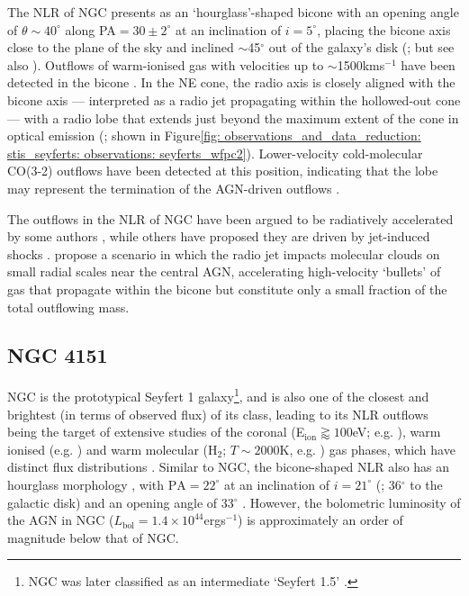 The NLR of NGC presents as an `hourglass'-shaped bicone \citep{Riffel2014, Barbosa2014, May2017} with an opening angle of $\theta \sim 40^\circ$ along PA$=30\pm2^\circ$ at an inclination of $i=5^\circ$, placing the bicone axis close to the plane of the sky and inclined $\sim$45$^\circ$ out of the galaxy's disk (\citealt{Das2006}; but see also \citealt{Crenshaw2000a}). Outflows of warm-ionised gas with velocities up to $\sim$1500\;km\;s$^{-1}$ have been detected in the bicone \citep{Crenshaw2000_N1068, Das2006}. In the NE cone, the radio axis is closely aligned with the bicone axis --- interpreted as a radio jet propagating within the hollowed-out cone --- with a radio lobe that extends just beyond the maximum extent of the cone in optical emission (\citealt{WilsonUlvestad1987}; shown in Figure\;\ref{fig: observations_and_data_reduction: stis_seyferts: observations: seyferts_wfpc2}). Lower-velocity cold-molecular CO(3-2) outflows have been detected at this position, indicating that the lobe may represent the termination of the AGN-driven outflows \citep{GarciaBurillo2014}.

The outflows in the NLR of NGC have been argued to be radiatively accelerated by some authors \citep{Kraemer2000III, Das2006, Revalski2021, Meena2023, Fischer2023}, while others have proposed they are driven by jet-induced shocks \citep{Capetti1997, Axon1998}. \citet{May2017} propose a scenario in which the radio jet impacts molecular clouds on small radial scales near the central AGN, accelerating high-velocity `bullets' of gas that propagate within the bicone but constitute only a small fraction of the total outflowing mass.

\vfill

\newpage

\subsection{NGC 4151}
\label{section: stis_seyferts: ngc4151}

NGC is the prototypical Seyfert 1 galaxy\footnote{NGC was later classified as an intermediate `Seyfert 1.5' \citep{OsterbrockKoski1976, Robinson1994}.}, and is also one of the closest and brightest (in terms of observed flux) of its class, leading to its NLR outflows being the target of extensive studies of the coronal (E$_\mathrm{ion}\gtrapprox100$\;eV; e.g. \citealt{Storchi-Bergmann2009, Storchi-Bergmann2010}), warm ionised (e.g. \citealt{Winge1997, Hutchings1999, Crenshaw2000_N4151, Das2005, May2020}) and warm molecular (H$_\mathrm{2}$; $T\sim2000$\;K, e.g. \citealt{May2020}) gas phases, which have distinct flux distributions \citep{Storchi-Bergmann2009}. Similar to NGC, the bicone-shaped NLR also has an hourglass morphology \citep{May2020}, with $\mathrm{PA}=22^\circ$ at an inclination of $i=21^\circ$ (\citealt{Pedlar1992}; 36$^\circ$ to the galactic disk) and an opening angle of 33$^\circ$ \citep{Das2005}. However, the bolometric luminosity of the AGN in NGC ($L_\mathrm{bol}=1.4\times10^{44}$\;erg\;s$^{-1}$) is approximately an order of magnitude below that of NGC.

